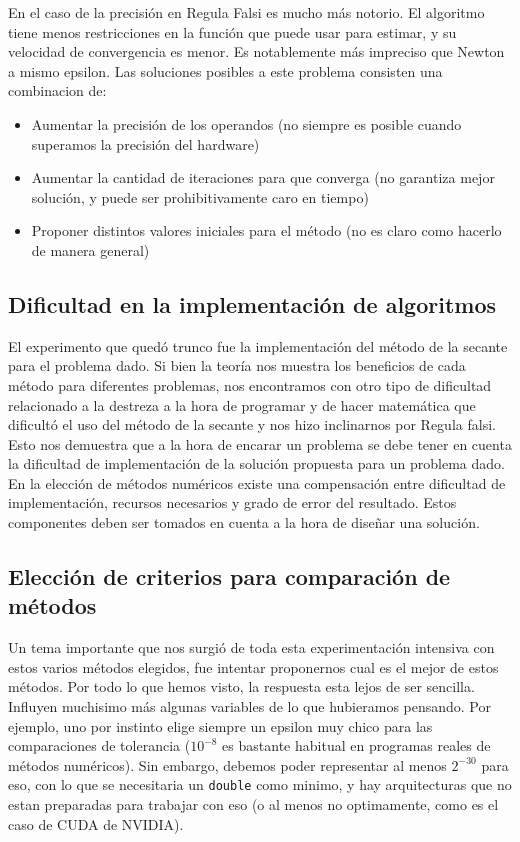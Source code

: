 En el caso de la precisi\'on en Regula Falsi es mucho m\'as notorio. El 
algoritmo tiene menos restricciones en la funci\'on que puede usar para estimar, 
y su velocidad de convergencia es menor. Es notablemente m\'as impreciso
que Newton a mismo epsilon. Las soluciones posibles a este problema consisten 
una combinacion de: 
\begin{itemize}
    \item Aumentar la precisi\'on de los operandos (no siempre es posible 
cuando superamos la precisi\'on del hardware)
    \item Aumentar la cantidad de iteraciones para que converga (no garantiza 
mejor soluci\'on, y puede ser prohibitivamente caro en tiempo)
    \item Proponer distintos valores iniciales para el m\'etodo (no es claro 
como hacerlo de manera general)
\end{itemize}

\subsection{Dificultad en la implementaci\'on de algoritmos}

El experimento que qued\'o trunco fue la implementaci\'on del m\'etodo de la 
secante para el problema dado. 
Si bien la teor\'ia nos muestra los beneficios de cada m\'etodo para diferentes 
problemas, nos encontramos con otro 
tipo de dificultad relacionado a la destreza a la hora de programar y de hacer 
matem\'atica que dificult\'o el uso 
del m\'etodo de la secante y nos hizo inclinarnos por Regula falsi. Esto nos 
demuestra que a la hora de encarar un 
problema se debe tener en cuenta la dificultad de implementaci\'on de la 
soluci\'on propuesta para un problema dado. 
En la elecci\'on de m\'etodos num\'ericos existe una compensaci\'on entre 
dificultad de implementaci\'on, recursos necesarios 
y grado de error del resultado. Estos componentes deben ser tomados en cuenta a 
la hora de dise\~nar una soluci\'on.


\subsection{Elecci\'on de criterios para comparaci\'on de m\'etodos}

Un tema importante que nos surgi\'o de toda esta experimentaci\'on intensiva
con estos varios m\'etodos elegidos, fue intentar proponernos cual es el mejor
de estos m\'etodos. Por todo lo que hemos visto, la respuesta esta lejos de
ser sencilla. Influyen muchisimo m\'as algunas variables de lo que hubieramos
pensando. Por ejemplo, uno por instinto elige siempre un epsilon muy chico
para las comparaciones de tolerancia ($10^{-8}$ es bastante habitual en programas
reales de m\'etodos num\'ericos). Sin embargo, debemos poder representar al 
menos $2^{-30}$ para eso, con lo que se necesitaria un \texttt{double} como minimo,
y hay arquitecturas que no estan preparadas para trabajar con eso (o al menos 
no optimamente, como es el caso de CUDA de NVIDIA). 

